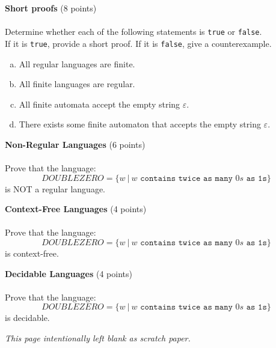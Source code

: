 \documentclass[12pt]{article}
\newenvironment{question}[2][Question]{\begin{trivlist}
\item[\hskip \labelsep {\bfseries #1}\hskip \labelsep {\bfseries #2.}]}{\end{trivlist}}
\begin{document}
\clearpage
\begin{question}{6}\textbf{Short proofs} (8 points)\\\\
Determine whether each of the following statements is \texttt{true} or \texttt{false}.\\ If it is \texttt{true}, provide a short proof. If it is \texttt{false}, give a counterexample.
\begin{enumerate}[(a)]
\item All regular languages are finite.\vspace{9em}

\item All finite languages are regular.\vspace{9em}

\item All finite automata accept the empty string $\varepsilon$.\vspace{9em}

\item There exists some finite automaton that accepts the empty string $\varepsilon$.

\end{enumerate}
\end{question}

\clearpage
\begin{question}{7}\textbf{Non-Regular Languages} (6 points)\\\\
Prove that the language: \[DOUBLEZERO = \{w \ | \ w \texttt{ contains twice as many } 0s \texttt{ as 1s}\}\] is NOT a regular language.
\end{question}

\clearpage
\begin{question}{8}\textbf{Context-Free Languages} (4 points)\\\\
Prove that the language:
\[DOUBLEZERO= \{w \ | \ w \texttt{ contains twice as many } 0s \texttt{ as 1s}\}\] is context-free.
\end{question}
	

\clearpage
\begin{question}{9}\textbf{Decidable Languages} (4 points)\\\\
Prove that the language:
\[DOUBLEZERO= \{w \ | \ w \texttt{ contains twice as many } 0s \texttt{ as 1s}\}\] is decidable.
\end{question}

\clearpage
\begin{center}
\vspace{-3em}
\textit{This page intentionally left blank as scratch paper.}
\end{center}


 
\end{document}
